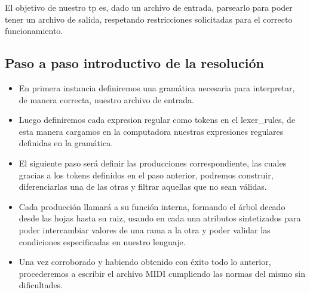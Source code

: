 El objetivo de nuestro tp es, dado un archivo de entrada, parsearlo para poder tener un archivo de salida, respetando restricciones solicitadas para el correcto funcionamiento.

\subsection{Paso a paso introductivo de la resolución}
\begin{itemize}
\item En primera instancia definiremos una gramática necesaria para interpretar, de manera correcta, nuestro archivo de entrada. 
\item Luego definiremos cada expresion regular como tokens en el lexer\_rules, de esta manera cargamos en la computadora nuestras expresiones regulares definidas en la gramática.
\item El siguiente paso será definir las producciones correspondiente, las cuales gracias a los tokens definidos en el paso anterior, podremos construir, diferenciarlas una de las otras y filtrar aquellas que no sean válidas.
\item Cada producción llamará a su función interna, formando el árbol decado desde las hojas hasta su raiz, usando en cada una atributos sintetizados para poder intercambiar valores de una rama a la otra y poder validar las condiciones especificadas en nuestro lenguaje.
\item Una vez corroborado y habiendo obtenido con éxito todo lo anterior, procederemos a escribir el archivo MIDI cumpliendo las normas del mismo sin dificultades.
\end{itemize}
